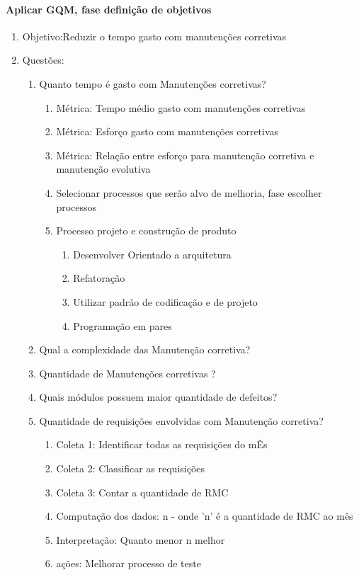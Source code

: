 \documentclass{article}
\begin{document}
\paragraph{Aplicar GQM, fase definição de objetivos}
\begin{enumerate}
\item Objetivo:Reduzir o tempo gasto com manutenções corretivas
\item Questões:
	\begin{enumerate}
	\item Quanto tempo é gasto com Manutenções corretivas?
		\begin{enumerate}
		\item Métrica: Tempo médio gasto com manutenções corretivas
		\item Métrica: Esforço gasto com manutenções corretivas
		\item Métrica: Relação entre esforço para manutenção corretiva e manutenção evolutiva
		\item {Selecionar processos que serão alvo de melhoria, fase escolher processos}
		\item Processo projeto e construção de produto

			\begin{enumerate}
			\item Desenvolver Orientado a arquitetura
			\item Refatoração
			\item Utilizar padrão de codificação e de projeto
			\item Programação em pares 
			\end{enumerate}				
		\end{enumerate}
	\item Qual a complexidade das Manutenção corretiva?
	\item Quantidade de Manutenções corretivas ?
	\item Quais módulos possuem maior quantidade de defeitos?
	\item Quantidade de requisições envolvidas com Manutenção corretiva?
		\begin{enumerate}
		\item Coleta 1: Identificar todas as requisições do mÊs
		\item Coleta 2: Classificar as requisições
		\item Coleta 3: Contar a quantidade de RMC
		\item Computação dos dados: n - onde 'n' é a quantidade de RMC ao mês
		\item Interpretação: Quanto menor n melhor
		\item ações: Melhorar processo de teste
		\end{enumerate}
	\end{enumerate}

\end{enumerate}
\end{document}
